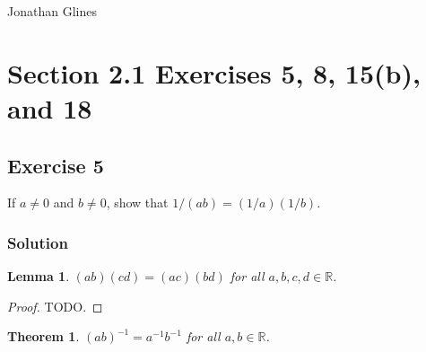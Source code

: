 \documentclass[12pt]{article}
\newtheorem*{thm}{Theorem}
\newtheorem{lem}{Lemma}
\begin{document}
\begin{flushright}
\Large{Jonathan Glines}
\end{flushright}
\section*{Section 2.1 Exercises 5, 8, 15(b), and 18}
\subsection*{Exercise 5}
If $a \ne 0$ and $b \ne 0$, show that $1/\left(ab\right) = \left(1/a\right)\left(1/b\right)$.


\subsubsection*{Solution}
\begin{lem}
$\left(ab\right)\left(cd\right) = \left(ac\right)\left(bd\right)$ for all $a, b, c, d \in \mathbb{R}$.
\end{lem}

\begin{proof}
TODO.
\end{proof}

\begin{thm}
$\left(ab\right)^{-1} = a^{-1}b^{-1}$ for all $a, b \in \mathbb{R}$.
\end{thm}
\end{document}
